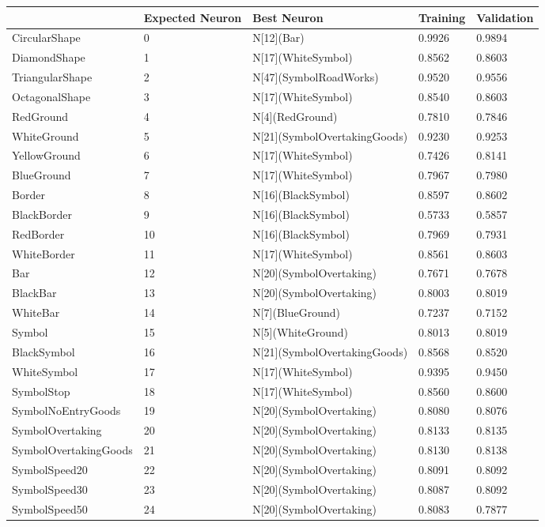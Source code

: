 \begin{tabular}{lllll}
\toprule
 & Expected Neuron & Best Neuron & Training & Validation \\
\midrule
CircularShape & 0 & N[12](Bar) & 0.9926 & 0.9894 \\
DiamondShape & 1 & N[17](WhiteSymbol) & 0.8562 & 0.8603 \\
TriangularShape & 2 & N[47](SymbolRoadWorks) & 0.9520 & 0.9556 \\
OctagonalShape & 3 & N[17](WhiteSymbol) & 0.8540 & 0.8603 \\
RedGround & 4 & N[4](RedGround) & 0.7810 & 0.7846 \\
WhiteGround & 5 & N[21](SymbolOvertakingGoods) & 0.9230 & 0.9253 \\
YellowGround & 6 & N[17](WhiteSymbol) & 0.7426 & 0.8141 \\
BlueGround & 7 & N[17](WhiteSymbol) & 0.7967 & 0.7980 \\
Border & 8 & N[16](BlackSymbol) & 0.8597 & 0.8602 \\
BlackBorder & 9 & N[16](BlackSymbol) & 0.5733 & 0.5857 \\
RedBorder & 10 & N[16](BlackSymbol) & 0.7969 & 0.7931 \\
WhiteBorder & 11 & N[17](WhiteSymbol) & 0.8561 & 0.8603 \\
Bar & 12 & N[20](SymbolOvertaking) & 0.7671 & 0.7678 \\
BlackBar & 13 & N[20](SymbolOvertaking) & 0.8003 & 0.8019 \\
WhiteBar & 14 & N[7](BlueGround) & 0.7237 & 0.7152 \\
Symbol & 15 & N[5](WhiteGround) & 0.8013 & 0.8019 \\
BlackSymbol & 16 & N[21](SymbolOvertakingGoods) & 0.8568 & 0.8520 \\
WhiteSymbol & 17 & N[17](WhiteSymbol) & 0.9395 & 0.9450 \\
SymbolStop & 18 & N[17](WhiteSymbol) & 0.8560 & 0.8600 \\
SymbolNoEntryGoods & 19 & N[20](SymbolOvertaking) & 0.8080 & 0.8076 \\
SymbolOvertaking & 20 & N[20](SymbolOvertaking) & 0.8133 & 0.8135 \\
SymbolOvertakingGoods & 21 & N[20](SymbolOvertaking) & 0.8130 & 0.8138 \\
SymbolSpeed20 & 22 & N[20](SymbolOvertaking) & 0.8091 & 0.8092 \\
SymbolSpeed30 & 23 & N[20](SymbolOvertaking) & 0.8087 & 0.8092 \\
SymbolSpeed50 & 24 & N[20](SymbolOvertaking) & 0.8083 & 0.7877 \\

\end{tabular}
